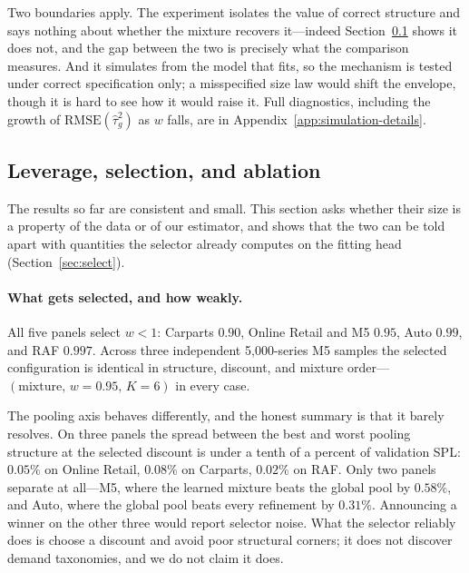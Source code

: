Two boundaries apply. The experiment isolates the value of correct
structure and says nothing about whether the mixture recovers it---indeed
Section~\ref{sec:leverage} shows it does not, and the gap between the two
is precisely what the comparison measures. And it simulates from the model
that \EBB{} fits, so the mechanism is tested under correct specification
only; a misspecified size law would shift the envelope, though it is hard
to see how it would raise it. Full diagnostics, including the growth of
$\mathrm{RMSE}(\hat\tau_g^2)$ as $w$ falls, are in
Appendix~\ref{app:simulation-details}.



\subsection{Leverage, selection, and ablation}
\label{sec:leverage}

The results so far are consistent and small. This section asks whether
their size is a property of the data or of our estimator, and shows that
the two can be told apart with quantities the selector already computes on
the fitting head (Section~\ref{sec:select}).

\paragraph{What gets selected, and how weakly.}
All five panels select $w<1$: Carparts $0.90$, Online Retail and M5
$0.95$, Auto $0.99$, and RAF $0.997$. Across three independent
5{,}000-series M5 samples the selected configuration is identical in
structure, discount, and mixture order---$(\text{mixture},\,w{=}0.95,\,
K{=}6)$ in every case.

The pooling axis behaves differently, and the honest summary is that it
barely resolves. On three panels the spread between the best and worst
pooling structure at the selected discount is under a tenth of a percent
of validation SPL: $0.05\%$ on Online Retail, $0.08\%$ on Carparts,
$0.02\%$ on RAF. Only two panels separate at all---M5, where the learned
mixture beats the global pool by $0.58\%$, and Auto, where the global pool
beats every refinement by $0.31\%$. Announcing a winner on the other three
would report selector noise. What the selector reliably does is choose a
discount and avoid poor structural corners; it does not discover demand
taxonomies, and we do not claim it does.

